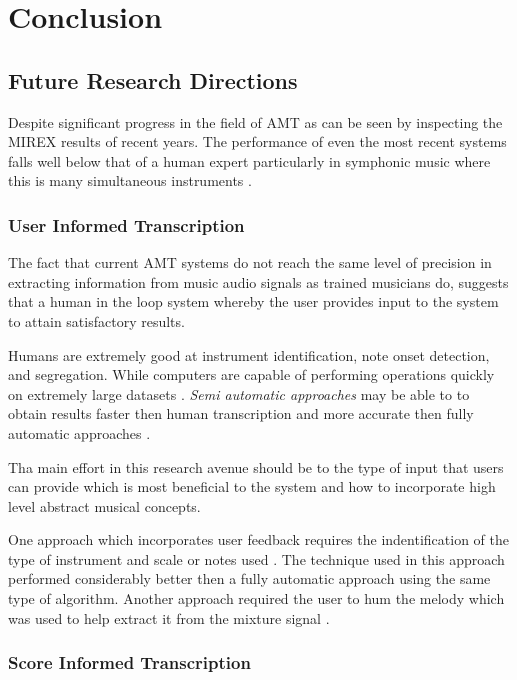 \chapter{Conclusion}
\label{ch:concl}

\section{Future Research Directions}

Despite significant progress in the field of \ac{AMT} as can be seen by inspecting
the \ac{MIREX} results \cite{MIREX} of recent years. The performance of even the most
recent systems falls well below that of a human expert particularly in symphonic
music where this is many simultaneous instruments \cite{roadmap-MIR:Serra2013}.

\subsection{User Informed Transcription}

The fact that current \ac{AMT} systems do not reach the same level of precision in
extracting information from music audio signals as trained musicians do,
suggests that a human in the loop system whereby the user provides input to the
system to attain satisfactory results.

Humans are extremely good at instrument identification, note onset detection,
and segregation. While computers are capable of performing operations quickly on
extremely large datasets \cite{ISMIR-tut:Benetos}. \emph{Semi automatic
    approaches} may be able to to obtain results faster then human transcription and
more accurate then fully automatic approaches \cite{ISMIR-tut:Benetos}.

Tha main effort in this research avenue should be to the type of input that
users can provide which is most beneficial to the system and how to incorporate
high level abstract musical concepts.

One approach which incorporates user feedback requires the indentification of
the type of instrument and scale or notes used \cite{user-inform:Kirchoff2012}.
The technique used in this approach performed considerably better then a fully
automatic approach using the same type of algorithm. Another approach required
the user to hum the melody which was used to help extract it from the mixture
signal \cite{humming2009:Smaragdis}.

\subsection{Score Informed Transcription}

